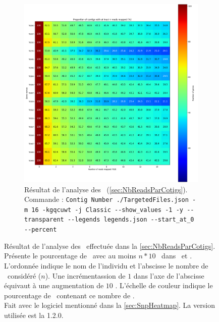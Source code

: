 \documentclass[../main]{subfiles} %
\begin{document}
\begin{landscape}
\begin{figure}[p]
\begin{subfigure}[b]{0.55\paperwidth}
        \includegraphics[width=\textwidth]{../Illustrations/Mo_Percent_Contig_Heatmap_global.png}
       \caption{Résultat de l'analyse des \BamTrMo (\ref{sec:NbReadsParCotigs}).\\
        Commande : \lstinline{Contig Number ./TargetedFiles.json -m 16 -kgqcuwt -j Classic --show_values -1 -y --transparent --legends legends.json --start_at_0 --percent}  
        }
        \label{fig:ContigsMoPercent}
    \end{subfigure}
    
    \caption{Résultat de l'analyse des \bam effectuée dans la \ref{sec:NbReadsParCotigs}. Présente le pourcentage de \contigs avec au moins $n * 10$ \reads dans \BamTrEx et \BamTrMo. L'ordonnée indique le nom de l'individu et l'abscisse le nombre de \reads considéré ($n$). Une incrémentassion de $1$ dans l'axe de l'abscisse équivaut à une augmentation de $10$ \reads. L'échelle de couleur indique le pourcentage de \contigs contenant ce nombre de \reads. \\ Fait avec le logiciel mentionné dans la \ref{sec:SnpHeatmap}. La version utilisée est la 1.2.0.}
    \label{fig:ContigPercentHeatmap}
    
\end{figure}
\end{landscape}
\restoregeometry
\end{document}

